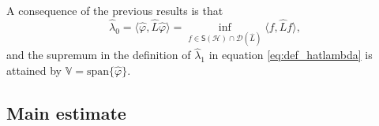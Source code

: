\documentclass{aptpub}
\newcommand{\Dom}{\mathcal D}
\newcommand{\lspan}{\mathrm{span}}
\renewcommand{\H}{\mathcal H}
\begin{document}



\begin{remark} \label{rem: conseq_eigenvalue}
    A consequence of the previous results is that
    \begin{equation}
        \widehat \lambda_0 = \langle \widehat \varphi ,\widehat L \widehat \varphi \rangle 
        = \inf_{f\in \mathsf S(\H)\cap \Dom(\widehat L)} \langle f,\widehat Lf\rangle,
        \label{eq:var_hatv0}
    \end{equation}
    and the supremum in the definition of $\widehat \lambda_1$ in equation \eqref{eq:def_hatlambda} is attained by $\mathbb V = \lspan\{\widehat{\varphi}\}$.
\end{remark}

\subsection{Main estimate}
\end{document}
